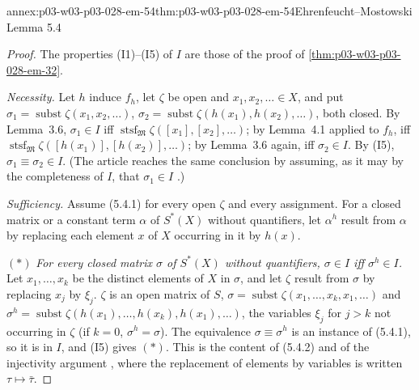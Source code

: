 \begin{annexitem}{annex:p03-w03-p03-028-em-54}{thm:p03-w03-p03-028-em-54}{Ehrenfeucht--Mostowski Lemma 5.4}
\begin{proof}
The properties (I1)--(I5) of \(I\) are those of the proof of
\cref{thm:p03-w03-p03-028-em-32}.

\emph{Necessity.}  Let \(h\) induce \(f_h\), let \(\zeta\) be open and
\(x_1,x_2,\ldots\in X\), and put
\(\sigma_1=\operatorname{subst}\zeta(x_1,x_2,\ldots)\),
\(\sigma_2=\operatorname{subst}\zeta(h(x_1),h(x_2),\ldots)\), both closed.  By
Lemma~3.6, \(\sigma_1\in I\) iff
\(\operatorname{stsf}_{\mathfrak M}\zeta([x_1],[x_2],\ldots)\); by Lemma~4.1
applied to \(f_h\), iff
\(\operatorname{stsf}_{\mathfrak M}\zeta([h(x_1)],[h(x_2)],\ldots)\); by
Lemma~3.6 again, iff \(\sigma_2\in I\).  By (I5), \(\sigma_1\equiv\sigma_2\in
I\).  (The article reaches the same conclusion by assuming, as it may by the
completeness of \(I\), that \(\sigma_1\in I\) \cite[p.~57]{EhrenfeuchtMostowski1956}.)

\emph{Sufficiency.}  Assume (5.4.1) for every open
\(\zeta\) and every assignment.  For a closed matrix or a constant term
\(\alpha\) of \(S^*(X)\) without quantifiers, let \(\alpha^h\) result from
\(\alpha\) by replacing each element \(x\) of \(X\) occurring in it by \(h(x)\).

\((\ast)\) \emph{For every closed matrix \(\sigma\) of \(S^*(X)\) without
quantifiers, \(\sigma\in I\) iff \(\sigma^h\in I\).}  Let \(x_1,\ldots,x_k\) be
the distinct elements of \(X\) in \(\sigma\), and let \(\zeta\) result from
\(\sigma\) by replacing \(x_j\) by \(\xi_j\).  \(\zeta\) is an open matrix of
\(S\), \(\sigma=\operatorname{subst}\zeta(x_1,\ldots,x_k,x_1,\ldots)\) and
\(\sigma^h=\operatorname{subst}\zeta(h(x_1),\ldots,h(x_k),h(x_1),\ldots)\), the
variables \(\xi_j\) for \(j>k\) not occurring in \(\zeta\) (if \(k=0\),
\(\sigma^h=\sigma\)).  The equivalence \(\sigma\equiv\sigma^h\) is an instance of
(5.4.1), so it is in \(I\), and (I5) gives \((\ast)\).
This is the content of (5.4.2) and of the injectivity argument
\cite[pp.~58--59]{EhrenfeuchtMostowski1956}, where the replacement of elements
by variables is written \(\tau\mapsto\bar\tau\).


\end{proof}
\end{annexitem}
